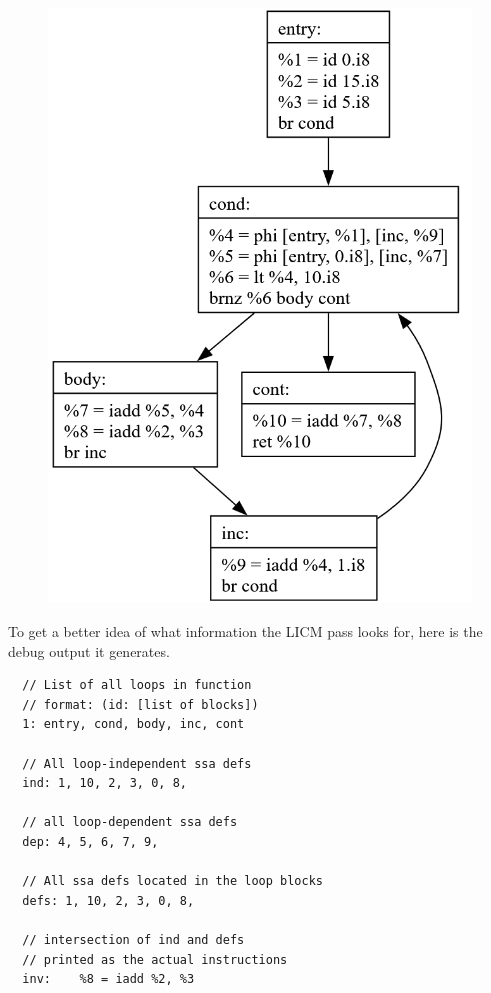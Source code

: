\documentclass[11pt, a4paper, titlepage]{article}
\begin{document}
\begin{figure}[H]
  \centering
  \includegraphics[scale=0.3]{images/i24.png}
\end{figure}

To get a better idea of what information the LICM pass looks for, here is the debug output it generates.

\begin{lstlisting}
  // List of all loops in function
  // format: (id: [list of blocks])
  1: entry, cond, body, inc, cont
  
  // All loop-independent ssa defs
  ind: 1, 10, 2, 3, 0, 8,
  
  // all loop-dependent ssa defs
  dep: 4, 5, 6, 7, 9,
  
  // All ssa defs located in the loop blocks
  defs: 1, 10, 2, 3, 0, 8,
  
  // intersection of ind and defs
  // printed as the actual instructions
  inv:    %8 = iadd %2, %3
\end{lstlisting}
\end{document}
